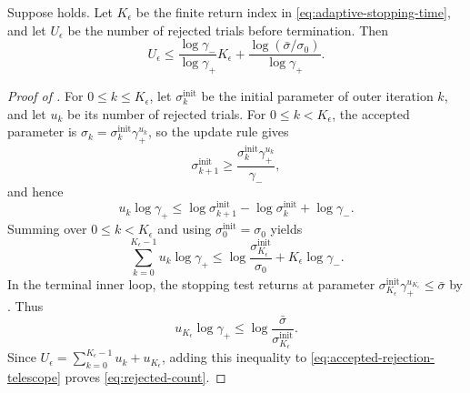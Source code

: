 \documentclass{article}
\begin{document}
\begin{lemma}\label{lem:rejected-trials}
Suppose  holds.  Let $K_\epsilon$ be the finite
return index in \eqref{eq:adaptive-stopping-time}, and let
$U_\epsilon$ be the number of rejected trials before termination.
Then
\begin{equation}\label{eq:rejected-count}
 U_\epsilon
 \le\frac{\log\gamma_-}{\log\gamma_+}K_\epsilon
 +\frac{\log(\bar\sigma/\sigma_0)}{\log\gamma_+}.
\end{equation}
\end{lemma}

\begin{proof}[Proof of ]
For $0\le k\le K_\epsilon$, let $\sigma_k^{\mathrm{init}}$ be the
initial parameter of outer iteration $k$, and let $u_k$ be its number
of rejected trials.  For
$0\le k<K_\epsilon$, the accepted parameter is
$\sigma_k=\sigma_k^{\mathrm{init}}\gamma_+^{u_k}$, so the update rule gives
\[
    \sigma_{k+1}^{\mathrm{init}}
    \ge\frac{\sigma_k^{\mathrm{init}}\gamma_+^{u_k}}{\gamma_-},
\]
and hence
\[
    u_k\log\gamma_+
    \le\log \sigma_{k+1}^{\mathrm{init}}
       -\log \sigma_k^{\mathrm{init}}+\log\gamma_-.
\]
Summing over $0\le k<K_\epsilon$ and using
$\sigma_0^{\mathrm{init}}=\sigma_0$ yields
\begin{equation}\label{eq:accepted-rejection-telescope}
    \sum_{k=0}^{K_\epsilon-1}u_k\log\gamma_+
    \le\log\frac{\sigma_{K_\epsilon}^{\mathrm{init}}}{\sigma_0}
       +K_\epsilon\log\gamma_-.
\end{equation}
In the terminal inner loop, the stopping test returns at parameter
$\sigma_{K_\epsilon}^{\mathrm{init}}
 \gamma_+^{u_{K_\epsilon}}\le\bar\sigma$ by
.  Thus
\[
    u_{K_\epsilon}\log\gamma_+
    \le\log\frac{\bar\sigma}{\sigma_{K_\epsilon}^{\mathrm{init}}}.
\]
Since
$U_\epsilon=\sum_{k=0}^{K_\epsilon-1}u_k+u_{K_\epsilon}$, adding this
inequality to
\eqref{eq:accepted-rejection-telescope} proves
\eqref{eq:rejected-count}.
\end{proof}
\end{document}
